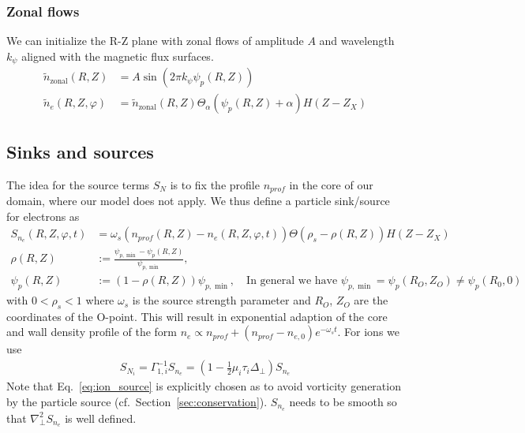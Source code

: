 \subsubsection{Zonal flows}
We can initialize the R-Z plane with zonal flows of amplitude $A$ and
wavelength $k_\psi$ aligned with the magnetic flux surfaces.
\begin{align} \label{eq:initial_zonal_flow}
    \tilde n_{\text{zonal}}(R,Z) &= A \sin (2\pi k_\psi \psi_p(R,Z)) \nonumber\\
\tilde n_e(R,Z,\varphi) &= \tilde n_{\text{zonal}}(R,Z)\Theta_{\alpha}(\psi_p(R, Z)+\alpha) H(Z-Z_X)
\end{align}

\subsection{Sinks and sources} \label{sec:sources}
The idea for the source terms $S_N$ is to fix the profile $n_{prof}$ in the
core of our domain, where our model does not apply.
We thus define a particle sink/source for electrons as
\begin{align} \label{eq:electron_source}
  S_{n_e}(R,Z,\varphi, t) &= \omega_s
    (n_{prof}(R,Z) - n_e(R,Z,\varphi, t))\Theta( \rho_{s} -\rho(R,Z)) H(Z-Z_X)\\
    \rho(R,Z) &:= \frac{\psi_{p,\min}- \psi_p(R,Z) }{\psi_{p,\min}},\\
    \psi_p(R,Z)&:= (1-\rho(R,Z))\psi_{p,\min},\quad \text{In general we have }\psi_{p,\min} = \psi_p(R_O, Z_O) \neq\psi_{p}(R_0,0)
\end{align}
with $0 < \rho_{s}<1$
where $\omega_s$ is the source strength parameter and $R_O$, $Z_O$ are the coordinates of the O-point.
This will result in exponential adaption of the core and wall
density profile of the form $n_e \propto n_{prof}+(n_{prof}-n_{e,0})e^{-\omega_st}$.
For ions we use
\begin{align}
    S_{N_i} = \Gamma_{1,i}^{-1} S_{n_e} = \left(1-\frac{1}{2}\mu_i \tau_i \Delta_\perp\right) S_{n_e}
  \label{eq:ion_source}
\end{align}
Note that Eq.~\eqref{eq:ion_source} is explicitly chosen as to avoid vorticity generation
by the particle source (cf.~Section~\ref{sec:conservation}). $S_{n_e}$ needs to be smooth
so that $\nabla_\perp^2 S_{n_e}$ is well defined.


